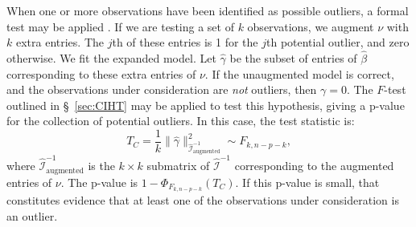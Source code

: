 \documentclass[12pt]{article}
\begin{document}
When one or more observations have been identified as possible outliers, a formal test may be applied \cite[\S~10.6.4]{Seber:2003}. If we are testing a set of $k$ observations, we augment $\nu$ with $k$ extra entries. The $j$th of these entries is 1 for the $j$th potential outlier, and zero otherwise. We fit the expanded model. Let $\hat{\gamma}$ be the subset of entries of $\hat{\beta}$ corresponding to these extra entries of $\nu$. If the unaugmented model is correct, and the observations under consideration are \textit{not} outliers, then $\gamma = 0$. The $F$-test outlined in \S~\ref{sec:CIHT} may be applied to test this hypothesis, giving a p-value for the collection of potential outliers. In this case, the test statistic is:
\begin{displaymath}
   T_C = \frac{1}{k} \| \hat{\gamma} \|_{\hat{\mathcal{I}}_{\textrm{augmented}}^{-1}}^2 \sim F_{k, n-p-k},
\end{displaymath}
where $\hat{\mathcal{I}}_{\textrm{augmented}}^{-1}$ is the $k \times k$ submatrix of $\hat{\mathcal{I}}^{-1}$ corresponding to the augmented entries of $\nu$. The p-value is $1 - \Phi_{F_{k, n-p-k}}(T_C)$. If this p-value is small, that constitutes evidence that at least one of the observations under consideration is an outlier.

\newpage

\end{document}
